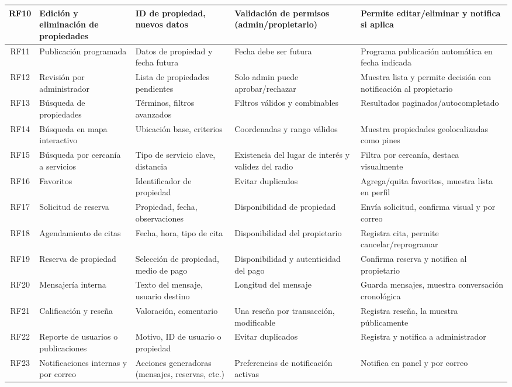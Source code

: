 \begin{landscape}
\begin{longtable}{|c|p{4cm}|p{5cm}|p{5cm}|p{6cm}|}
		\hline
		RF10 & Edición y eliminación de propiedades & ID de propiedad, nuevos datos & Validación de permisos (admin/propietario) & Permite editar/eliminar y notifica si aplica \\
		\hline
		RF11 & Publicación programada & Datos de propiedad y fecha futura & Fecha debe ser futura & Programa publicación automática en fecha indicada \\
		\hline
		RF12 & Revisión por administrador & Lista de propiedades pendientes & Solo admin puede aprobar/rechazar & Muestra lista y permite decisión con notificación al propietario \\
		\hline
		RF13 & Búsqueda de propiedades & Términos, filtros avanzados & Filtros válidos y combinables & Resultados paginados/autocompletado \\
		\hline
		RF14 & Búsqueda en mapa interactivo & Ubicación base, criterios & Coordenadas y rango válidos & Muestra propiedades geolocalizadas como pines \\
		\hline
		RF15 & Búsqueda por cercanía a servicios & Tipo de servicio clave, distancia & Existencia del lugar de interés y validez del radio & Filtra por cercanía, destaca visualmente \\
		\hline
		RF16 & Favoritos & Identificador de propiedad & Evitar duplicados & Agrega/quita favoritos, muestra lista en perfil \\
		\hline
		RF17 & Solicitud de reserva & Propiedad, fecha, observaciones & Disponibilidad de propiedad & Envía solicitud, confirma visual y por correo \\
		\hline
		RF18 & Agendamiento de citas & Fecha, hora, tipo de cita & Disponibilidad del propietario & Registra cita, permite cancelar/reprogramar \\
		\hline
		RF19 & Reserva de propiedad & Selección de propiedad, medio de pago & Disponibilidad y autenticidad del pago & Confirma reserva y notifica al propietario \\
		\hline
		RF20 & Mensajería interna & Texto del mensaje, usuario destino & Longitud del mensaje & Guarda mensajes, muestra conversación cronológica \\
		\hline
		RF21 & Calificación y reseña & Valoración, comentario & Una reseña por transacción, modificable & Registra reseña, la muestra públicamente \\
		\hline
		RF22 & Reporte de usuarios o publicaciones & Motivo, ID de usuario o propiedad & Evitar duplicados & Registra y notifica a administrador \\
		\hline
		RF23 & Notificaciones internas y por correo & Acciones generadoras (mensajes, reservas, etc.) & Preferencias de notificación activas & Notifica en panel y por correo \\

\end{longtable}
\end{landscape}
